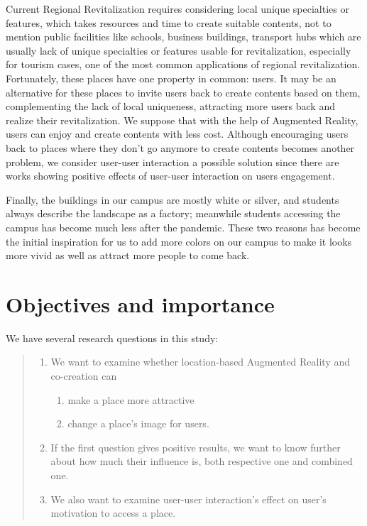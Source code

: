 Current Regional Revitalization requires considering local unique specialties or features, which takes resources and time to create suitable contents,
not to mention public facilities like schools, business buildings, transport hubs which are usually lack of unique specialties or features usable for revitalization,
especially for tourism cases, one of the most common applications of regional revitalization.
Fortunately, these places have one property in common: users. It may be an alternative for these places to invite users back to create contents based on them,
complementing the lack of local uniqueness, attracting more users back and realize their revitalization.
We suppose that with the help of Augmented Reality, users can enjoy and create contents with less cost.
Although encouraging users back to places where they don't go anymore to create contents becomes another problem,
we consider user-user interaction a possible solution since there are works showing positive effects of user-user interaction on users engagement.


Finally, the buildings in our campus are mostly white or silver, and students always describe the landscape as a factory; meanwhile students accessing the campus has become much less after the pandemic.
These two reasons has become the initial inspiration for us to add more colors on our campus to make it looks more vivid as well as attract more people to come back.

\section{Objectives and importance}


We have several research questions in this study:
\begin{quote}
  \begin{enumerate}
    \item We want to examine whether location-based Augmented Reality and co-creation can
      \begin{enumerate}
        \item make a place more attractive
        \item change a place's image for users.
      \end{enumerate}
    \item If the first question gives positive results, we want to know further about how much their influence is, both respective one and combined one.
    \item We also want to examine user-user interaction's effect on user's motivation to access a place.
  \end{enumerate}
\end{quote}

